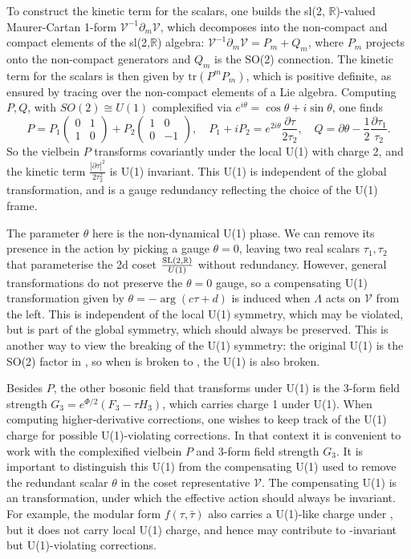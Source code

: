 To construct the kinetic term for the scalars, one builds the sl(2, $\mathbb{R}$)-valued Maurer-Cartan 1-form $\mathcal{V}^{-1}\partial_m\mathcal{V}$, which decomposes into the non-compact and compact elements of the sl(2,$\mathbb{R}$) algebra: $\mathcal{V}^{-1}\partial_m\mathcal{V} = P_m + Q_m$, where $P_m$ projects onto the non-compact generators and $Q_m$ is the SO(2) connection.
The kinetic term for the scalars is then given by $\mathrm{tr}(P^m P_m)$, which is positive definite, as ensured by tracing over the non-compact elements of a Lie algebra.
Computing $P, Q$, with $SO(2)\cong U(1)$ complexified via $e^{i\theta} = \cos\theta + i\sin\theta$, one finds
\begin{equation}
P = P_1\begin{pmatrix}
    0&1\\1&0
\end{pmatrix}+P_2\begin{pmatrix}
    1&0\\0&-1
\end{pmatrix},\quad
P_1 + iP_2 = e^{2i\theta}\frac{\partial \tau}{2 \tau_2},\quad
Q = \partial \theta - \frac{1}{2}\frac{\partial \tau_1}{\tau_2}.
\end{equation}
So the vielbein $P$ transforms covariantly under the local U(1) with charge 2, and the kinetic term $\frac{|\partial \tau|^2}{2\tau_2^2}$ is U(1) invariant.
This U(1) is independent of the global \SLR{} transformation, and is a gauge redundancy reflecting the choice of the U(1) frame.

The parameter $\theta$ here is the non-dynamical U(1) phase.
We can remove its presence in the action by picking a gauge $\theta = 0$, leaving two real scalars $\tau_1, \tau_2$ that parameterise the 2d coset $\frac{\mathrm{SL}(2,\mathbb{R}){}}{U(1)}$ without redundancy.
However, general \SLR{} transformations do not preserve the $\theta = 0$ gauge, so a compensating U(1) transformation given by $\theta = -\arg(c\tau+d)$ is induced when $\Lambda$ acts on $\mathcal{V}$ from the left.
This is independent of the local U(1) symmetry, which may be violated, but is part of the global \SLZ{} symmetry, which should always be preserved.
This is another way to view the breaking of the U(1) symmetry: the original U(1) is the SO(2) factor in \SLR{}, so when \SLR{} is broken to \SLZ{}, the U(1) is also broken.

Besides $P$, the other bosonic field that transforms under U(1) is the 3-form field strength $G_3 = e^{\Phi/2}(F_3 - \tau H_3)$, which carries charge 1 under U(1).
When computing higher-derivative corrections, one wishes to keep track of the U(1) charge for possible U(1)-violating corrections. In that context it is convenient to work with the complexified vielbein $P$ and 3-form field strength $G_3$.
It is important to distinguish this U(1) from the compensating U(1) used to remove the redundant scalar $\theta$ in the coset representative $\mathcal{V}$. The compensating U(1) is an \SLZ{} transformation, under which the effective action should always be invariant. For example, the modular form $f(\tau, \bar\tau)$ also carries a U(1)-like charge under \SLZ{}, but it does not carry local U(1) charge, and hence may contribute to \SLZ{}-invariant but U(1)-violating corrections.
